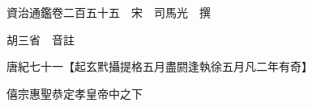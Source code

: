 










 


 
 


 

  
  
  
  
  





  
  
  
  
  
 
  

  

  
  
  



  

 
 

  
   




  

  
  


  　　資治通鑑卷二百五十五　宋　司馬光　撰

　　胡三省　音註

　　唐紀七十一【起玄黓攝提格五月盡閼逢執徐五月凡二年有奇】

　　僖宗惠聖恭定孝皇帝中之下

